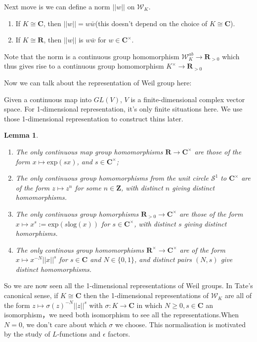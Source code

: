 \documentclass{article}
\theoremstyle{theorem}
\newtheorem{lem}{Lemma}
\begin{document}
Next move is we can define a norm $||w||$ on $\mathcal{W}_{K}$. 
\begin{enumerate}
    \item If $K\cong \mathbf{C}$, then $||w||=w\bar{w}$(this doesn't depend on the choice of $K\cong\mathbf{C}$).
    \item If $K\cong \mathbf{R}$, then $||w||$ is $w\bar{w}$ for $w\in\mathbf{C}^{\times}$. 
\end{enumerate}
Note that the norm is a continuous group homomorphism $\mathcal{W}^{ab}_{K}\rightarrow\mathbf{R}_{>0}$ which thus gives rise to a continuous group homomorphism $K^{\times}\rightarrow \mathbf{R}_{>0}$

Now we can talk about the representation of Weil group here:

Given a continuous map into $GL(V)$, $V$ is a finite-dimensional complex vector space.
For 1-dimensional representation, it's only finite situations here. We use those 1-dimensional representation to construct thins later.
\begin{lem}
\begin{enumerate}
    \item The only continuous map group homomorphisms $\mathbf{R}\rightarrow\mathbf{C}^{\times}$ are those of the form $x\mapsto \text{exp}(sx)$, and $s\in \mathbf{C}^{\times}$;
    \item The only continuous group homomorphisms from the unit circle $\mathcal{S}^{1}$ to $\mathbf{C}^{\times}$ are of the form $z\mapsto z^{n}$ for some $n\in\mathbf{Z}$, with distinct $n$ giving distinct homomorphisms.
    \item The only continuous group homorphisms $\mathbf{R}_{>0}\rightarrow \mathbf{C}^{\times}$ are those of the form $x\mapsto x^{s}:=\text{exp}(s\text{log}(x))$ for $s\in\mathbf{C}^{\times}$, with distinct $s$ giving distinct homorphisms.
    \item The only continous group homomorphisms $\mathbf{R}^{\times}\rightarrow \mathbf{C}^{\times}$ are of the form $x\mapsto x^{-N}||x||^{s}$ for $s\in\mathbf{C}$ and $N\in\{0,1\}$, and distinct pairs $(N,s)$ give distinct homomorphisms.
\end{enumerate}
\end{lem}

So we are now seen all the 1-dimensional representations of Weil groups. In Tate's canonical sense, if $K\cong\mathbf{C}$ then the 1-dimensional representations of $\mathcal{W}_{K}$ are all of the form $z\mapsto \sigma(z)^{-N}||z||^{s}$ with $\sigma: K\rightarrow\mathbf{C}$ in which $N\geq0,s\in\mathbf{C}$ an isomorphism，we need both isomorphism to see all the representations.When $N=0$, we don't care about which $\sigma$ we choose. This normalisation is motivated by the study of $L$-functions and $\epsilon$ factors.
\end{document}

